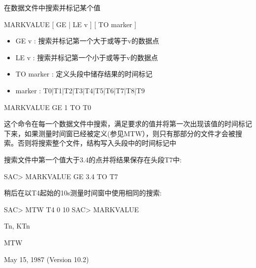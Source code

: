 \label{cmd:markvalue}

在数据文件中搜索并标记某个值

MARKVALUE [ GE | LE v ] [ TO marker ]

\begin{itemize}
\item GE v : 搜索并标记第一个大于或等于v的数据点 
\item LE v : 搜索并标记第一个小于或等于v的数据点 
\item TO marker : 定义头段中储存结果的时间标记 
\item marker : T0|T1|T2|T3|T4|T5|T6|T7|T8|T9 
\end{itemize}

MARKVALUE GE 1 TO T0

这个命令在每一个数据文件中搜索，满足要求的值并将第一次出现该值的时间标记下来，如果测量时间窗已经被定义(参见MTW），则只有那部分的文件才会被搜索。否则将搜索整个文件，结构写入头段中的时间标记中

搜索文件中第一个值大于3.4的点并将结果保存在头段T7中:
\begin{SACCode}
SAC> MARKVALUE GE 3.4 TO T7
\end{SACCode}

稍后在以T4起始的10s测量时间窗中使用相同的搜索:
\begin{SACCode}
SAC> MTW T4 0 10
SAC> MARKVALUE
\end{SACCode}

Tn, KTn

MTW

May 15, 1987 (Version 10.2)
